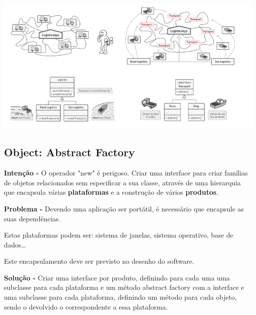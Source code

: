 \documentclass{article}
\begin{document}
\begin{flushleft}
    \begin{center}
        \includegraphics[scale=0.5]{Images/26.png}
    \end{center}
\end{flushleft}


\subsection{Object: Abstract Factory}

\begin{flushleft}
    \textbf{Intenção -} O operador "new" é perigoso. Criar uma interface para criar famílias de objetos relacionados sem especificar a sua
    classe, através de uma hierarquia que encapsula várias \textbf{plataformas} e a construção de
    vários \textbf{produtos}.
\end{flushleft}

\begin{flushleft}
    \textbf{Problema -} Devendo uma aplicação ser portátil, é necessário que encapsule as suas
    dependências.

    Estas plataformas podem ser: sistema de janelas, sistema operativo, base de dados\dots

    Este encapsulamento deve ser previsto no desenho do software.
\end{flushleft}

\begin{flushleft}
    \textbf{Solução -} Criar uma interface por produto, definindo para cada uma uma subclasse para cada
    plataforma e um método abstract factory com a interface e uma subclasse para
    cada plataforma, definindo um método para cada objeto, sendo o devolvido o
    correspondente a essa plataforma.
\end{flushleft}

\pagebreak
\end{document}

